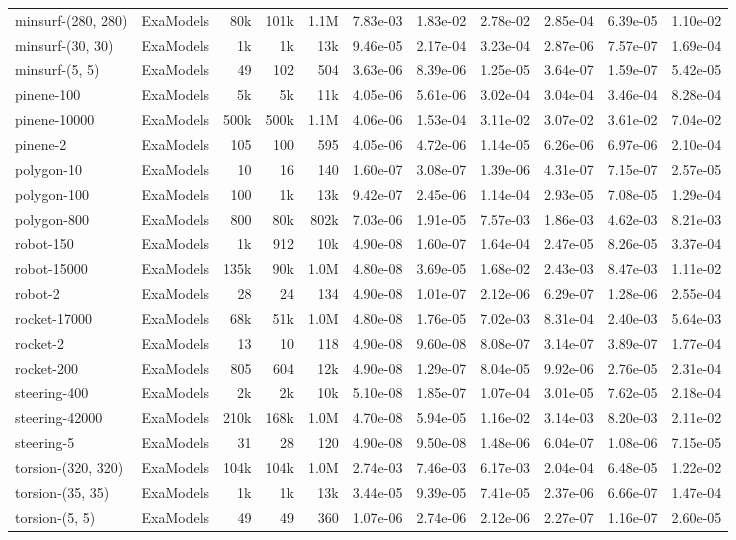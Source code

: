 {\begin{longtable}{@{}ll rrr rrr rr r@{}}
  minsurf-(280, 280) & ExaModels & 80k & 101k & 1.1M & 7.83e-03 & 1.83e-02 & 2.78e-02 & 2.85e-04 & 6.39e-05 & 1.10e-02 \\
  minsurf-(30, 30) & ExaModels & 1k & 1k & 13k & 9.46e-05 & 2.17e-04 & 3.23e-04 & 2.87e-06 & 7.57e-07 & 1.69e-04 \\
  minsurf-(5, 5) & ExaModels & 49 & 102 & 504 & 3.63e-06 & 8.39e-06 & 1.25e-05 & 3.64e-07 & 1.59e-07 & 5.42e-05 \\
  pinene-100 & ExaModels & 5k & 5k & 11k & 4.05e-06 & 5.61e-06 & 3.02e-04 & 3.04e-04 & 3.46e-04 & 8.28e-04 \\
  pinene-10000 & ExaModels & 500k & 500k & 1.1M & 4.06e-06 & 1.53e-04 & 3.11e-02 & 3.07e-02 & 3.61e-02 & 7.04e-02 \\
  pinene-2 & ExaModels & 105 & 100 & 595 & 4.05e-06 & 4.72e-06 & 1.14e-05 & 6.26e-06 & 6.97e-06 & 2.10e-04 \\
  polygon-10 & ExaModels & 10 & 16 & 140 & 1.60e-07 & 3.08e-07 & 1.39e-06 & 4.31e-07 & 7.15e-07 & 2.57e-05 \\
  polygon-100 & ExaModels & 100 & 1k & 13k & 9.42e-07 & 2.45e-06 & 1.14e-04 & 2.93e-05 & 7.08e-05 & 1.29e-04 \\
  polygon-800 & ExaModels & 800 & 80k & 802k & 7.03e-06 & 1.91e-05 & 7.57e-03 & 1.86e-03 & 4.62e-03 & 8.21e-03 \\
  robot-150 & ExaModels & 1k & 912 & 10k & 4.90e-08 & 1.60e-07 & 1.64e-04 & 2.47e-05 & 8.26e-05 & 3.37e-04 \\
  robot-15000 & ExaModels & 135k & 90k & 1.0M & 4.80e-08 & 3.69e-05 & 1.68e-02 & 2.43e-03 & 8.47e-03 & 1.11e-02 \\
  robot-2 & ExaModels & 28 & 24 & 134 & 4.90e-08 & 1.01e-07 & 2.12e-06 & 6.29e-07 & 1.28e-06 & 2.55e-04 \\
  rocket-17000 & ExaModels & 68k & 51k & 1.0M & 4.80e-08 & 1.76e-05 & 7.02e-03 & 8.31e-04 & 2.40e-03 & 5.64e-03 \\
  rocket-2 & ExaModels & 13 & 10 & 118 & 4.90e-08 & 9.60e-08 & 8.08e-07 & 3.14e-07 & 3.89e-07 & 1.77e-04 \\
  rocket-200 & ExaModels & 805 & 604 & 12k & 4.90e-08 & 1.29e-07 & 8.04e-05 & 9.92e-06 & 2.76e-05 & 2.31e-04 \\
  steering-400 & ExaModels & 2k & 2k & 10k & 5.10e-08 & 1.85e-07 & 1.07e-04 & 3.01e-05 & 7.62e-05 & 2.18e-04 \\
  steering-42000 & ExaModels & 210k & 168k & 1.0M & 4.70e-08 & 5.94e-05 & 1.16e-02 & 3.14e-03 & 8.20e-03 & 2.11e-02 \\
  steering-5 & ExaModels & 31 & 28 & 120 & 4.90e-08 & 9.50e-08 & 1.48e-06 & 6.04e-07 & 1.08e-06 & 7.15e-05 \\
  torsion-(320, 320) & ExaModels & 104k & 104k & 1.0M & 2.74e-03 & 7.46e-03 & 6.17e-03 & 2.04e-04 & 6.48e-05 & 1.22e-02 \\
  torsion-(35, 35) & ExaModels & 1k & 1k & 13k & 3.44e-05 & 9.39e-05 & 7.41e-05 & 2.37e-06 & 6.66e-07 & 1.47e-04 \\
  torsion-(5, 5) & ExaModels & 49 & 49 & 360 & 1.07e-06 & 2.74e-06 & 2.12e-06 & 2.27e-07 & 1.16e-07 & 2.60e-05 \\
  \bottomrule
\end{longtable}
}
